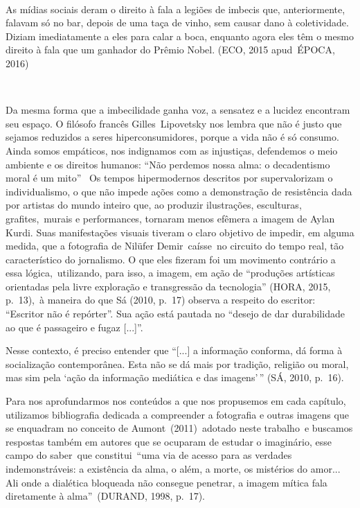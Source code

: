 \documentclass[
  letterpaper,
  a4paper,
  12pt]{scrbook}
\renewenvironment{quote}
  {\par\singlespacing\small\list{}{\rightmargin=0cm \leftmargin=4cm}%
   \item\relax}
  {\endlist}
\begin{document}
~

\begin{quote}
As mídias sociais deram o direito à fala a legiões de imbecis que,
anteriormente, falavam só no bar, depois de uma taça de vinho, sem
causar dano à coletividade. Diziam imediatamente a eles para calar a
boca, enquanto agora eles têm o mesmo direito à fala que um ganhador do
Prêmio Nobel. (ECO, 2015 apud~ÉPOCA, 2016)~
\end{quote}

~

Da mesma forma que a imbecilidade ganha voz, a sensatez e a lucidez
encontram seu espaço. O filósofo francês Gilles~Lipovetsky
\autocite*{lipovetsky2004tempos} nos lembra que não é justo que sejamos
reduzidos a seres hiperconsumidores, porque a vida não é só consumo.
Ainda somos empáticos, nos indignamos com as injustiças, defendemos o
meio ambiente e os direitos humanos: ``Não perdemos nossa alma: o
decadentismo moral é um mito''
\autocite[pp.~413]{lipovetsky2004tempos}~Os tempos hipermodernos
descritos por \autocite{lipovetsky2004tempos} supervalorizam o
individualismo, o que não impede ações como a demonstração de
resistência dada por artistas do mundo inteiro que, ao produzir
ilustrações, esculturas, grafites,~murais e performances, tornaram menos
efêmera a imagem de Aylan Kurdi. Suas manifestações visuais tiveram o
claro objetivo de impedir, em alguma medida, que a fotografia de Nilüfer
Demir~caísse~no circuito do tempo real, tão característico do
jornalismo. O que eles fizeram foi um movimento contrário a essa
lógica,~utilizando, para isso, a imagem, em ação de ``produções
artísticas orientadas pela livre exploração e transgressão da
tecnologia'' (HORA, 2015, p.~13),~à maneira do que Sá (2010, p.~17)
observa a respeito do escritor: ``Escritor não é repórter''. Sua ação
está pautada no ``desejo de dar durabilidade ao que é passageiro e fugaz
{[}...{]}''.

Nesse contexto, é preciso entender que ``{[}...{]} a informação
conforma, dá forma à socialização contemporânea. Esta não se dá mais por
tradição, religião ou moral, mas sim pela `ação da informação mediática
e das imagens'\,'' (SÁ, 2010, p.~16).

Para nos aprofundarmos nos conteúdos a que nos propusemos em cada
capítulo, utilizamos bibliografia dedicada a compreender a fotografia e
outras imagens que se enquadram no conceito de Aumont~(2011)~adotado
neste trabalho~e buscamos respostas também em autores que se ocuparam de
estudar o imaginário, esse campo do saber~que constitui~``uma via de
acesso para as verdades indemonstráveis: a existência da alma, o além, a
morte, os mistérios do amor... Ali onde a dialética bloqueada não
consegue penetrar, a imagem mítica fala diretamente à alma''~(DURAND,
1998, p.~17).
\end{document}
